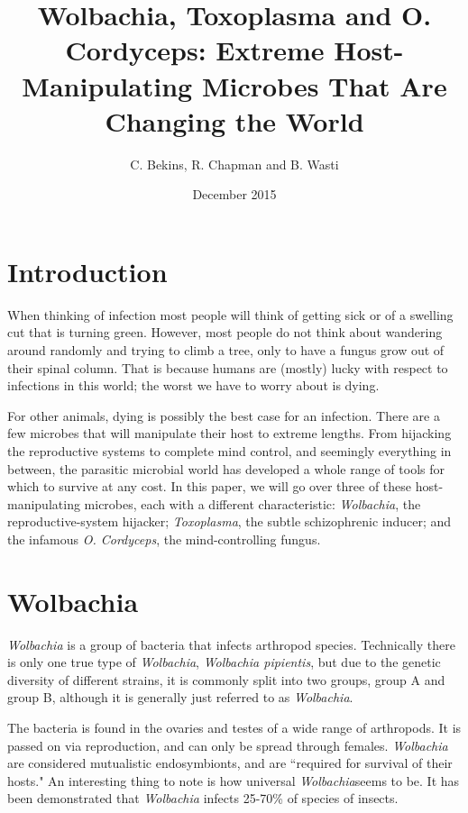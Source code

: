 \documentclass[twocolumn]{article}
\begin{document}
\title{Wolbachia, Toxoplasma and O. Cordyceps: Extreme Host-Manipulating Microbes That Are Changing the World}
    \author{C. Bekins, R. Chapman and B. Wasti}
    \date{December 2015}
    \maketitle

\section*{Introduction}
When thinking of infection most people will think of getting sick or of a swelling cut that is turning green. However, most people do not think about wandering around randomly and trying to climb a tree, only to have a fungus grow out of their spinal column. That is because humans are (mostly) lucky with respect to infections in this world; the worst we have to worry about is dying.

For other animals, dying is possibly the best case for an infection. There are a few microbes that will manipulate their host to extreme lengths. From hijacking the reproductive systems to complete mind control, and seemingly everything in between, the parasitic microbial world has developed a whole range of tools for which to survive at any cost. In this paper, we will go over three of these host-manipulating microbes, each with a different characteristic: \textit{Wolbachia}, the reproductive-system hijacker; \textit{Toxoplasma}, the subtle schizophrenic inducer; and the infamous \textit{O. Cordyceps}, the mind-controlling fungus. 

\section*{Wolbachia}
\textit{Wolbachia} is a group of bacteria that infects arthropod species. Technically there is only one true type of \textit{Wolbachia}, \textit{Wolbachia pipientis}, but due to the genetic diversity of different strains, it is commonly split into two groups, group A and group B, although it is generally just referred to as \textit{Wolbachia}.

The bacteria is found in the ovaries and testes of a wide range of arthropods.\cite{Wbio} It is passed on via reproduction, and can only be spread through females. \textit{Wolbachia} are considered mutualistic endosymbionts, and are ``required for survival of their hosts."\cite{Wdisc_nem} An interesting thing to note is how universal \textit{Wolbachia}seems to be. It has been demonstrated that \textit{Wolbachia} infects 25-70\% of species of insects.\cite{Wdisc_nem}
\end{document}
